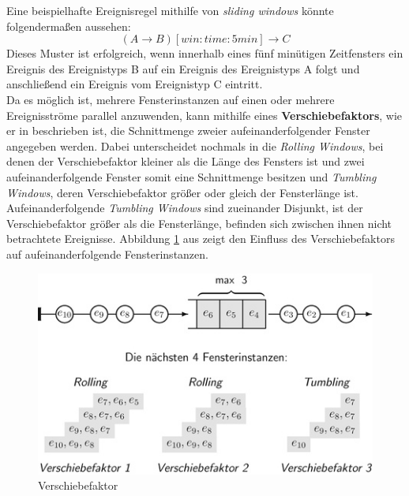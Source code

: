 \documentclass{acm_proc_article-sp}
\begin{document}
Eine beispielhafte Ereignisregel mithilfe von \textit{sliding windows} könnte 
folgendermaßen 
aussehen:
$$(A \rightarrow B)[win:time:5min] \rightarrow C$$
Dieses Muster ist erfolgreich, wenn innerhalb eines fünf minütigen Zeitfensters ein 
Ereignis des Ereignistyps B auf ein Ereignis des Ereignistyps A folgt und anschließend 
ein Ereignis vom Ereignistyp C eintritt.\\
Da es möglich ist, mehrere Fensterinstanzen auf einen oder mehrere Ereignisströme 
parallel 
anzuwenden, kann mithilfe eines \textbf{Verschiebefaktors}\label{kap:verschiebefaktor}, 
wie er in \cite{hedtstuck} beschrieben 
ist, die Schnittmenge zweier aufeinanderfolgender Fenster angegeben werden. Dabei 
unterscheidet \cite{hedtstuck} nochmals in die \textit{Rolling Windows}, bei denen der 
Verschiebefaktor kleiner als die Länge des Fensters ist und zwei aufeinanderfolgende 
Fenster somit eine Schnittmenge besitzen und \textit{Tumbling Windows}, deren 
Verschiebefaktor größer oder gleich der Fensterlänge ist. Aufeinanderfolgende 
\textit{Tumbling Windows} sind zueinander Disjunkt, ist der Verschiebefaktor größer 
als die Fensterlänge, befinden sich zwischen ihnen nicht betrachtete Ereignisse. 
Abbildung \ref{img:factors} aus \cite{hedtstuck} zeigt den Einfluss des 
Verschiebefaktors auf aufeinanderfolgende Fensterinstanzen.

\begin{figure}[H]
    \centering
    \includegraphics[width=\linewidth]{img/factor-hedstuck}
    \caption{Verschiebefaktor}
    \label{img:factors}
\end{figure}
\end{document}
